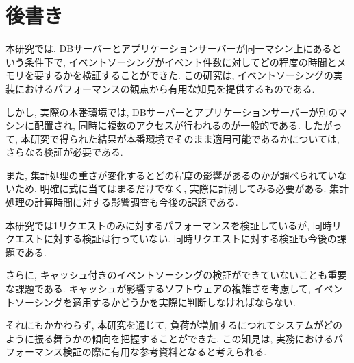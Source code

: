\documentclass[../../main]{subfiles}
\begin{document}
    \section{後書き}\label{sec:afterword}

    本研究では, DBサーバーとアプリケーションサーバーが同一マシン上にあるという条件下で, イベントソーシングがイベント件数に対してどの程度の時間とメモリを要するかを検証することができた. この研究は, イベントソーシングの実装におけるパフォーマンスの観点から有用な知見を提供するものである.

    しかし, 実際の本番環境では, DBサーバーとアプリケーションサーバーが別のマシンに配置され, 同時に複数のアクセスが行われるのが一般的である. したがって, 本研究で得られた結果が本番環境でそのまま適用可能であるかについては, さらなる検証が必要である.

    また, 集計処理の重さが変化するとどの程度の影響があるのかが調べられていないため, 明確に式に当てはまるだけでなく, 実際に計測してみる必要がある. 集計処理の計算時間に対する影響調査も今後の課題である.

    本研究では1リクエストのみに対するパフォーマンスを検証しているが, 同時リクエストに対する検証は行っていない. 同時リクエストに対する検証も今後の課題である.

    さらに, キャッシュ付きのイベントソーシングの検証ができていないことも重要な課題である. キャッシュが影響するソフトウェアの複雑さを考慮して, イベントソーシングを適用するかどうかを実際に判断しなければならない.

    それにもかかわらず, 本研究を通じて, 負荷が増加するにつれてシステムがどのように振る舞うかの傾向を把握することができた. この知見は, 実務におけるパフォーマンス検証の際に有用な参考資料となると考えられる.

    \clearpage
\end{document}
